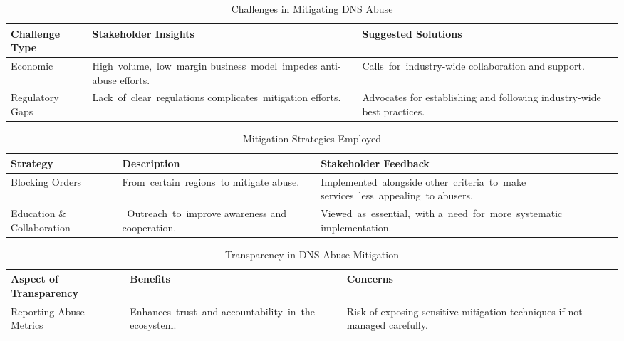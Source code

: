 {

\begin{table}[H]
\centering
\footnotesize 
\begin{tabular}{|l|p{4cm}|p{4cm}|}
\hline
\textbf{Challenge Type} & \textbf{Stakeholder Insights} & \textbf{Suggested Solutions} \\
\hline
Economic & \mbox {High volume, low margin} \mbox {business model impedes} anti-abuse efforts. & \mbox {Calls for industry-wide} collaboration and support. \\
\hline
Regulatory Gaps & \mbox {Lack of clear regulations} \mbox {complicates mitigation} efforts. & Advocates for establishing and following industry-wide best practices. \\
\hline
\end{tabular}
\caption{Challenges in Mitigating DNS Abuse}
\label{table:challenges_in_mitigation}
\end{table}


}

{

\begin{table}[H]
\centering
\footnotesize 
\begin{tabular}{|l|p{4cm}|p{4cm}|}
\hline
\textbf{Strategy} & \textbf{Description} & \textbf{Stakeholder Feedback} \\
\hline
Blocking Orders & \mbox {From certain regions to} mitigate abuse. & \mbox {Implemented alongside} \mbox {other criteria to make} \mbox {services less appealing to} abusers. \\
\hline
Education \& Collaboration & \mbox { Outreach to improve} awareness and cooperation. & \mbox {Viewed as essential, with} \mbox {a need for more systematic} implementation. \\
\hline
\end{tabular}
\caption{Mitigation Strategies Employed}
\label{table:mitigation_strategies}
\end{table}

}

{
\begin{table}[H]
\centering
\footnotesize 
\begin{tabular}{|l|p{4cm}|p{4cm}|}
\hline
\textbf{Aspect of Transparency} & \textbf{Benefits} & \textbf{Concerns} \\
\hline
Reporting Abuse Metrics & \mbox {Enhances trust and} \mbox {accountability in the} ecosystem. & Risk of exposing sensitive mitigation techniques if not managed carefully. \\
\hline
\end{tabular}
\caption{Transparency in DNS Abuse Mitigation}
\label{table:transparency_in_mitigation}
\end{table}


}

